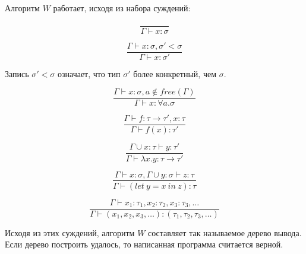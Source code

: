 Алгоритм $W$ работает, исходя из набора суждений:

\begin{equation}
    \label{eq:taut}
    \tag{TAUT}
    \frac{}{\Gamma \vdash x: \sigma}
\end{equation}

\begin{equation}
    \label{eq:inst}
    \tag{INST}
    \frac{\Gamma \vdash x: \sigma, \sigma' < \sigma}{\Gamma \vdash x: \sigma'}
\end{equation}

Запись $\sigma' < \sigma$ означает, что тип $\sigma'$ более конкретный, чем $\sigma$.

\begin{equation}
    \label{eq:gen}
    \tag{GEN}
    \frac{\Gamma \vdash x: \sigma, a \notin free(\Gamma)}{\Gamma \vdash x: \forall a. \sigma}
\end{equation}

\begin{equation}
    \label{eq:comb}
    \tag{COMB}
    \frac{\Gamma \vdash f: \tau \to \tau', x: \tau}{\Gamma \vdash f(x): \tau'}
\end{equation}

\begin{equation}
    \label{eq:abs}
    \tag{ABS}
    \frac{\Gamma \cup x: \tau \vdash y: \tau'}{\Gamma \vdash \lambda x. y : \tau \to \tau'}
\end{equation}

\begin{equation}
    \label{eq:let}
    \tag{LET}
    \frac{\Gamma \vdash x: \sigma, \Gamma \cup y: \sigma \vdash z: \tau}{\Gamma \vdash (let ~ y = x ~ in ~ z): \tau}
\end{equation}

\begin{equation}
    \label{eq:tuple}
    \tag{TUPLE}
    \frac{\Gamma \vdash x_1: \tau_1, x_2: \tau_2, x_3: \tau_3, \ldots}{\Gamma \vdash (x_1, x_2, x_3, \ldots): (\tau_1, \tau_2, \tau_3, \ldots)}
\end{equation}

Исходя из этих суждений, алгоритм $W$ составляет так называемое дерево вывода.
Если дерево построить удалось, то написанная программа считается верной.


